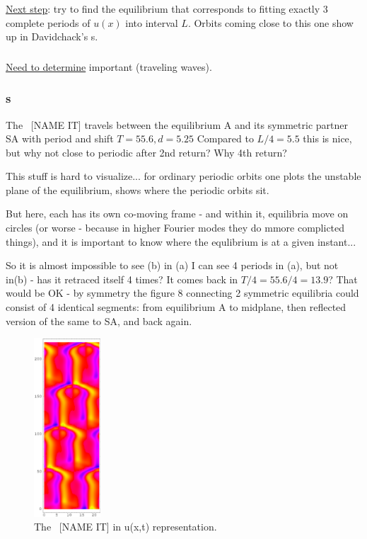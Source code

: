 \underline{Next step}: try to find the equilibrium that corresponds to fitting
exactly 3 complete periods of $u(x)$ into interval $L$.
Orbits coming close to this one
show up in Davidchack's \rpo s.

\subsubsection{\Reqva}

\underline{Need to determine} important {\Reqva} (traveling waves).

\subsubsection{\Rpo s}


The \rpo\ [NAME IT] travels between the equilibrium A and its symmetric partner SA 
with period and shift
$T=55.6, d=5.25$
Compared to $L/4 = 5.5$
this is nice, but why not close to periodic after 2nd return? Why 4th return?

This stuff is hard to visualize... for ordinary periodic orbits one
plots the unstable plane of the equilibrium, shows where the periodic
orbits sit.

But here, each {\rpo} has its own co-moving frame - and within it, equilibria
move on circles (or worse - because in higher Fourier modes they do mmore
complicted things), and it is important to know where the equlibrium is at
a given instant...

So it is almost impossible to see (b) %
in (a) %
I can see 4 periods in (a), %
but not in(b) %
- has it retraced itself 4 times? It comes back in
$T/4=55.6/4=13.9$? That would be OK - by symmetry the figure 8 connecting
2 symmetric equilibria could consist of 4 identical segments: from
equilibrium A to midplane, then reflected version of the same to SA, and
back again.


\begin{figure}[t] %
\centering
 	\includegraphics[width=2.5cm]{figs/rpo22-55-4-u.eps}
\hspace{0.1in}
\caption{
 The \rpo\ [NAME IT] in u(x,t) representation. 
        }
\label{f:rpoNAMEITu}
\end{figure}


